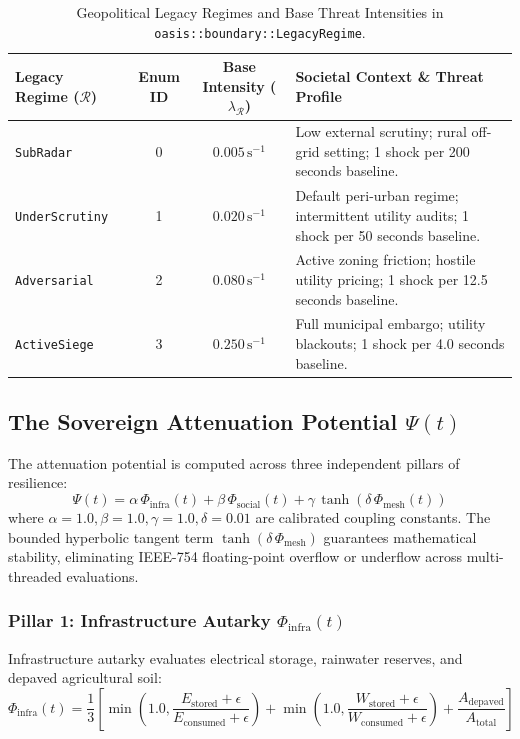 \begin{table}[htbp]
\centering
\small
\begin{tabular}{|l|c|c|p{}|}
\hline
\textbf{Legacy Regime ($\mathcal{R}$)} & \textbf{Enum ID} & \textbf{Base Intensity ($\lambda_{\mathcal{R}}$)} & \textbf{Societal Context \& Threat Profile} \\
\hline
\texttt{SubRadar} & 0 & $0.005\,\mathrm{s^{-1}}$ & Low external scrutiny; rural off-grid setting; 1 shock per 200 seconds baseline. \\
\hline
\texttt{UnderScrutiny} & 1 & $0.020\,\mathrm{s^{-1}}$ & Default peri-urban regime; intermittent utility audits; 1 shock per 50 seconds baseline. \\
\hline
\texttt{Adversarial} & 2 & $0.080\,\mathrm{s^{-1}}$ & Active zoning friction; hostile utility pricing; 1 shock per 12.5 seconds baseline. \\
\hline
\texttt{ActiveSiege} & 3 & $0.250\,\mathrm{s^{-1}}$ & Full municipal embargo; utility blackouts; 1 shock per 4.0 seconds baseline. \\
\hline
\end{tabular}
\caption{Geopolitical Legacy Regimes and Base Threat Intensities in \texttt{oasis::boundary::LegacyRegime}.}
\label{tab:legacy_regimes}
\end{table}

\subsection{The Sovereign Attenuation Potential \texorpdfstring{$\Psi(t)$}{Psi(t)}}
The attenuation potential is computed across three independent pillars of resilience:
\begin{equation}
\Psi(t) = \alpha \, \Phi_{\mathrm{infra}}(t) + \beta \, \Phi_{\mathrm{social}}(t) + \gamma \, \tanh\left( \delta \, \Phi_{\mathrm{mesh}}(t) \right)
\label{eq:sovereign_attenuation_potential}
\end{equation}
where $\alpha = 1.0, \beta = 1.0, \gamma = 1.0, \delta = 0.01$ are calibrated coupling constants. The bounded hyperbolic tangent term $\tanh(\delta \, \Phi_{\mathrm{mesh}})$ guarantees mathematical stability, eliminating IEEE-754 floating-point overflow or underflow across multi-threaded evaluations.

\subsubsection{Pillar 1: Infrastructure Autarky \texorpdfstring{$\Phi_{\mathrm{infra}}(t)$}{Phi\_infra(t)}}
Infrastructure autarky evaluates electrical storage, rainwater reserves, and depaved agricultural soil:
\begin{equation}
\Phi_{\mathrm{infra}}(t) = \frac{1}{3} \left[ \min\left(1.0, \frac{E_{\mathrm{stored}} + \epsilon}{E_{\mathrm{consumed}} + \epsilon}\right) + \min\left(1.0, \frac{W_{\mathrm{stored}} + \epsilon}{W_{\mathrm{consumed}} + \epsilon}\right) + \frac{A_{\mathrm{depaved}}}{A_{\mathrm{total}}} \right]
\label{eq:phi_infra}
\end{equation}

